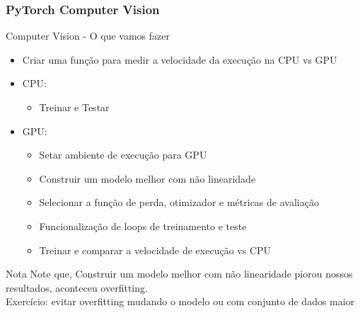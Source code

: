 \documentclass{beamer}
\begin{document}
\begin{frame}
	\frametitle{PyTorch Computer Vision}
	\begin{block}{Computer Vision - O que vamos fazer}
		\begin{itemize}
			\item Criar uma função para medir a velocidade da execução na CPU vs GPU
			\item CPU:
			\begin{itemize}
				\item Treinar e Testar
			\end{itemize}
			\item GPU:
			\begin{itemize}
				\item Setar ambiente de execução para GPU
				\item Construir um modelo melhor com não linearidade
				\item Selecionar a função de perda, otimizador e métricas de avaliação
				\item Funcionalização de loops de treinamento e teste
				\item Treinar e comparar a velocidade de execução vs CPU
			\end{itemize}
		\end{itemize}
	\end{block}
	\begin{alertblock}{Nota}
		Note que, Construir um modelo melhor com não linearidade piorou nossos resultados, aconteceu overfitting. \\
		Exercício: evitar overfitting mudando o modelo ou com conjunto de dados maior
	\end{alertblock}
\end{frame}
\end{document}
